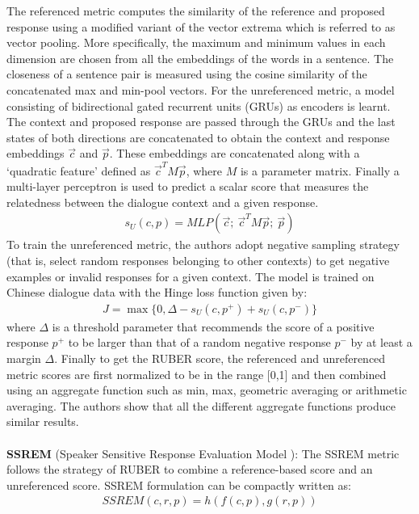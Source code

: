 The referenced metric computes the similarity of the reference and proposed response using a modified variant of the vector extrema which is referred to as vector pooling. More specifically, the maximum and minimum values in each dimension are chosen from all the embeddings of the words in a sentence. The closeness of a sentence pair is measured using the cosine similarity of the concatenated max and min-pool vectors.
For the unreferenced metric, a model consisting of bidirectional gated recurrent units (GRUs) as encoders is learnt. The context and proposed response are passed through the GRUs and the last states of both directions are concatenated to obtain the context and response embeddings $\overrightarrow{c}$ and $\overrightarrow{p}$. These embeddings are concatenated along with a `quadratic feature' defined as $\overrightarrow{c}^TM\overrightarrow{p}$, where $M$ is a parameter matrix. Finally a multi-layer perceptron is used to predict a scalar score that measures the relatedness between the dialogue context and a given response. 
\begin{align*}
    s_U(c,p) = MLP(\overrightarrow{c};\ \overrightarrow{c}^TM\overrightarrow{p};\ \overrightarrow{p})
\end{align*}
To train the unreferenced metric, the authors adopt negative sampling strategy (that is, select random responses belonging to other contexts) to get negative examples or invalid responses for a given context. The model is trained on Chinese dialogue data with the Hinge loss function given by: 
\begin{align*}
    J = \max \{0, \Delta - s_U(c,p^+) + s_U(c,p^-) \}
\end{align*}
where $\Delta$ is a threshold parameter that recommends the score of a positive response $p^+$ to be larger than that of a random negative response $p^-$ by at least a margin $\Delta$.
Finally to get the RUBER score, the referenced and unreferenced metric scores are first normalized to be in the range [0,1] and then combined using an aggregate function such as min, max, geometric averaging or arithmetic averaging. The authors show that all the different aggregate functions produce similar results.\\
\\
\textbf{SSREM} (Speaker Sensitive Response Evaluation Model  ): The SSREM metric follows the strategy of RUBER to combine a reference-based score and an unreferenced score. SSREM formulation can be compactly written as:
\begin{align*}
    SSREM(c,r,p) = h(f(c,p),g(r,p))
\end{align*}
